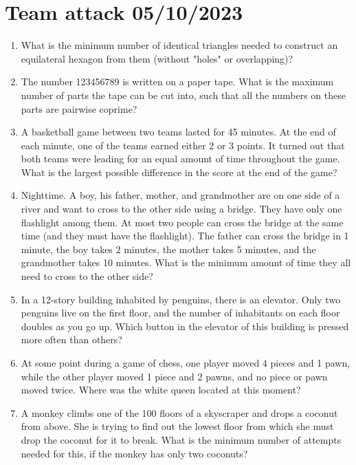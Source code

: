 \documentclass[11pt]{article}
\begin{document}
  \pagestyle{empty}
  \section*{Team attack 05/10/2023}
  \enlargethispage*{2\baselineskip}
  \begin{enumerate}[leftmargin=0mm]
    \item What is the minimum number of identical triangles needed to construct an equilateral hexagon from them (without "holes" or overlapping)? %
    \item The number 123456789 is written on a paper tape. What is the maximum number of parts the tape can be cut into, such that all the numbers on these parts are pairwise coprime? %
    \item A basketball game between two teams lasted for 45 minutes. At the end of each minute, one of the teams earned either 2 or 3 points. It turned out that both teams were leading for an equal amount of time throughout the game. What is the largest possible difference in the score at the end of the game? %
    \item 
    Nighttime. A boy, his father, mother, and grandmother are on one side of a river and want to cross to the other side using a bridge. They have only one flashlight among them. At most two people can cross the bridge at the same time (and they must have the flashlight). The father can cross the bridge in 1 minute, the boy takes 2 minutes, the mother takes 5 minutes, and the grandmother takes 10 minutes. What is the minimum amount of time they all need to cross to the other side? %
    \item In a 12-story building inhabited by penguins, there is an elevator. Only two penguins live on the first floor, and the number of inhabitants on each floor doubles as you go up. Which button in the elevator of this building is pressed more often than others? %
    \item At some point during a game of chess, one player moved 4 pieces and 1 pawn, while the other player moved 1 piece and 2 pawns, and no piece or pawn moved twice. Where was the white queen located at this moment? %
    \item A monkey climbs one of the 100 floors of a skyscraper and drops a coconut from above. She is trying to find out the lowest floor from which she must drop the coconut for it to break. What is the minimum number of attempts needed for this, if the monkey has only two coconuts? %
  \end{enumerate}
\end{document}
